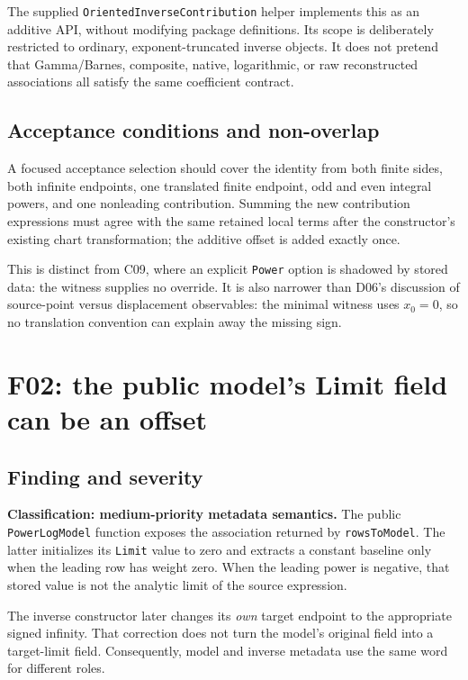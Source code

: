 \documentclass[11pt,letterpaper]{article}
\newcommand{\code}[1]{\nolinkurl{#1}}
\begin{document}
The supplied \code{OrientedInverseContribution} helper implements this as an additive API, without modifying package definitions. Its scope is deliberately restricted to ordinary, exponent-truncated inverse objects. It does not pretend that Gamma/Barnes, composite, native, logarithmic, or raw reconstructed associations all satisfy the same coefficient contract.

\subsection{Acceptance conditions and non-overlap}
A focused acceptance selection should cover the identity from both finite sides, both infinite endpoints, one translated finite endpoint, odd and even integral powers, and one nonleading contribution. Summing the new contribution expressions must agree with the same retained local terms after the constructor's existing chart transformation; the additive offset is added exactly once.

This is distinct from C09, where an explicit \code{Power} option is shadowed by stored data: the witness supplies no override. It is also narrower than D06's discussion of source-point versus displacement observables: the minimal witness uses \(x_0=0\), so no translation convention can explain away the missing sign.\cite{register,r6}

\section{F02: the public model's Limit field can be an offset}
\label{sec:limit}

\subsection{Finding and severity}
\textbf{Classification: medium-priority metadata semantics.}
The public \code{PowerLogModel} function exposes the association returned by \code{rowsToModel}. The latter initializes its \code{Limit} value to zero and extracts a constant baseline only when the leading row has weight zero. When the leading power is negative, that stored value is not the analytic limit of the source expression.\cite{core}

The inverse constructor later changes its \emph{own} target endpoint to the appropriate signed infinity. That correction does not turn the model's original field into a target-limit field. Consequently, model and inverse metadata use the same word for different roles.
\end{document}
